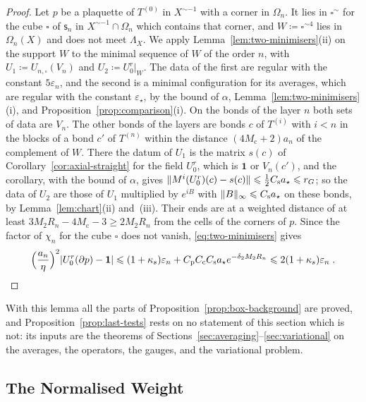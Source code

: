\documentclass[11pt]{preprint}
\newcommand{\id}{\mathbf 1}
\DeclarePairedDelimiter{\abs}{\lvert}{\rvert}
\DeclarePairedDelimiter{\norm}{\lVert}{\rVert}
\numberwithin{equation}{section}
\begin{document}
\begin{proof}
Let $p$ be a plaquette of $T^{(0)}$ in $X^{\sim-1}$ with a corner in $\Omega_n$. It lies in $\square^\sim$ for the cube $\square$ of $\mathsf s_n$ in $X^{\sim-1} \cap \Omega_n$ which contains that corner, and $W \coloneqq \square^{\sim4}$ lies in $\Omega_n(X)$ and does not meet $\Lambda_X$. We apply Lemma~\ref{lem:two-minimisers}(ii) on the support $W$ to the minimal sequence of $W$ of the order $n$, with $U_1 \coloneqq U_{n,\square}(V_n)$ and $U_2 \coloneqq U^r_0|_W$. The data of the first are regular with the constant $5\varepsilon_n$, and the second is a minimal configuration for its averages, which are regular with the constant $\varepsilon_\star$, by the bound of $\alpha$, Lemma~\ref{lem:two-minimisers}(i), and Proposition~\ref{prop:comparison}(i). On the bonds of the layer $n$ both sets of data are $V_n$. The other bonds of the layers are bonds $c$ of $T^{(i)}$ with $i < n$ in the blocks of a bond $c'$ of $T^{(n)}$ within the distance $(4M_{\mathrm c} + 2)a_n$ of the complement of $W$. There the datum of $U_1$ is the matrix $s(c)$ of Corollary~\ref{cor:axial-straight} for the field $U^r_0$, which is $\id$ or $V_n(c')$, and the corollary, with the bound of $\alpha$, gives $\norm{M^i(U^r_0)(c) - s(c)} \leqslant \frac{1}{2}C_{\mathrm s}a_\star \leqslant r_G$; so the data of $U_2$ are those of $U_1$ multiplied by $e^{iB}$ with $\norm B_\infty \leqslant C_{\mathrm s}a_\star$ on these bonds, by Lemma~\ref{lem:chart}(ii) and~(iii). Their ends are at a weighted distance of at least $3M_2R_n - 4M_{\mathrm c} - 3 \geqslant 2M_2R_n$ from the cells of the corners of $p$. Since the factor of $\chi_n$ for the cube $\square$ does not vanish, \eqref{eq:two-minimisers} gives
\[
    \Bigl(\frac{a_n}{\eta}\Bigr)^2\abs{U^r_0(\partial p) - \id} \leqslant (1 + \kappa_s)\varepsilon_n + C_{\mathrm p}C_{\mathrm c}C_{\mathrm s}a_\star e^{-\delta_2M_2R_n} \leqslant 2(1 + \kappa_s)\varepsilon_n\;.
\]
\end{proof}

With this lemma all the parts of Proposition~\ref{prop:box-background} are proved, and Proposition~\ref{prop:last-tests} rests on no statement of this section which is not: its inputs are the theorems of Sections~\ref{sec:averaging}--\ref{sec:variational} on the averages, the operators, the gauges, and the variational problem.

\subsection{The Normalised Weight}\label{sec:normalised-weight}
\end{document}
